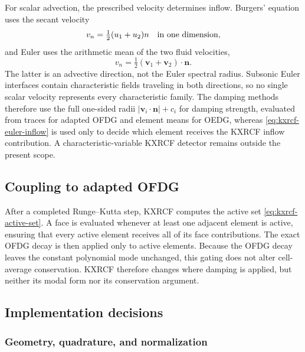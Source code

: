 For scalar advection, the prescribed velocity determines inflow.  Burgers'
equation uses the secant velocity
\begin{equation}
  v_n=\tfrac12(u_1+u_2)n\quad\hbox{in one dimension},
\end{equation}
and Euler uses the arithmetic mean of the two fluid velocities,
\begin{equation}
  v_n=\tfrac12(\boldsymbol v_1+\boldsymbol v_2)
      \cdot\boldsymbol n.
  \label{eq:kxrcf-euler-inflow}
\end{equation}
The latter is an advective direction, not the Euler spectral radius.  Subsonic
Euler interfaces contain characteristic fields traveling in both directions,
so no single scalar velocity represents every characteristic family.  The damping methods therefore use the full one-sided radii
$|\boldsymbol v_i\cdot\boldsymbol n|+c_i$ for damping strength, evaluated from traces for adapted OFDG and element means for OEDG, whereas
\cref{eq:kxrcf-euler-inflow} is used only to decide which element receives the
KXRCF inflow contribution.  A characteristic-variable KXRCF detector remains
outside the present scope.

\subsection{Coupling to adapted OFDG}

After a completed Runge--Kutta step, KXRCF computes the active set
\cref{eq:kxrcf-active-set}.  A face is evaluated whenever at least one adjacent
element is active, ensuring that every active element receives all of its face
contributions.  The exact OFDG decay is then applied only to active elements.
Because the OFDG decay leaves the constant polynomial mode unchanged, this
gating does not alter cell-average conservation.  KXRCF therefore changes where
damping is applied, but neither its modal form nor its conservation argument.

\subsection{Implementation decisions}

\subsubsection{Geometry, quadrature, and normalization}

